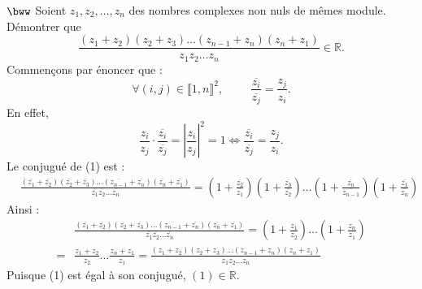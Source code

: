 \documentclass[11pt]{article}
\begin{document}
\begin{exercice}{$\bww$}{}
    Soient $z_1,z_2,\dots,z_n$ des nombres complexes non nuls de mêmes module. Démontrer que
    \begin{equation}
        \frac{(z_1 + z_2)(z_2 + z_3)\dots(z_{n-1}+z_n)(z_n + z_1)}{z_1z_2\dots z_n} \in \mathbb{R}.
    \end{equation}
    \tcblower
    Commençons par énoncer que :
    \begin{equation*}
        \forall{(i,j)\in\llbracket1,n\rrbracket^2}, \hspace{1cm} \frac{\overline{z_i}}{\overline{z_j}}=\frac{z_j}{z_i}.
    \end{equation*}
    En effet,
    \begin{equation*}
        \frac{z_i}{z_j}\cdot\frac{\overline{z_i}}{\overline{z_j}}=\left|\frac{z_i}{z_j}\right|^2=1 \iff \frac{\overline{z_i}}{\overline{z_j}}=\frac{z_j}{z_i}.
    \end{equation*}
    Le conjugué de (1) est :
    \begin{align*}
        &\frac{(\overline{z_1} + \overline{z_2})(\overline{z_2} + \overline{z_3})\dots(\overline{z_{n-1}}+\overline{z_n})(\overline{z_n} + \overline{z_1})}{\overline{z_1}\overline{z_2}\dots\overline{z_n}}=(1+\frac{\overline{z_2}}{\overline{z_1}})(1+\frac{\overline{z_3}}{\overline{z_2}})\dots(1+\frac{\overline{z_n}}{\overline{z_{n-1}}})(1+\frac{\overline{z_1}}{\overline{z_n}})
    \end{align*}
    Ainsi :
    \begin{align*}
        &\frac{(\overline{z_1} + \overline{z_2})(\overline{z_2} + \overline{z_3})\dots(\overline{z_{n-1}}+\overline{z_n})(\overline{z_n} + \overline{z_1})}{\overline{z_1}\overline{z_2}\dots\overline{z_n}}=(1+\frac{z_1}{z_2})\dots(1+\frac{z_n}{z_1})\\
        =&\frac{z_1+z_2}{z_2}\dots\frac{z_n+z_1}{z_1}=\frac{(z_1+z_2)(z_2+z_3)\dots(z_{n-1}+z_n)(z_n+z_1)}{z_1z_2\dots z_n}
    \end{align*}
    Puisque (1) est égal à son conjugué, $(1) \in \mathbb{R}$.
\end{exercice}

\pagebreak
\end{document}
